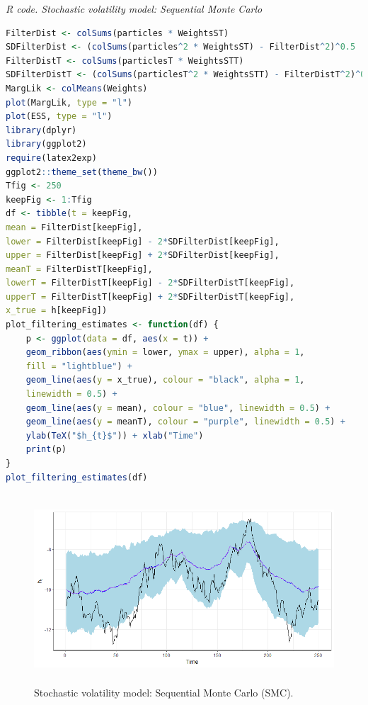 \begin{enumerate}[leftmargin=*]
\begin{tcolorbox}[enhanced,width=4.67in,center upper,
	fontupper=\large\bfseries,drop shadow southwest,sharp corners]
	\textit{R code. Stochastic volatility model: Sequential Monte Carlo}
	\begin{VF}
		\begin{lstlisting}[language=R]
FilterDist <- colSums(particles * WeightsST)
SDFilterDist <- (colSums(particles^2 * WeightsST) - FilterDist^2)^0.5
FilterDistT <- colSums(particlesT * WeightsSTT)
SDFilterDistT <- (colSums(particlesT^2 * WeightsSTT) - FilterDistT^2)^0.5
MargLik <- colMeans(Weights)
plot(MargLik, type = "l")
plot(ESS, type = "l")
library(dplyr)
library(ggplot2)
require(latex2exp)
ggplot2::theme_set(theme_bw())
Tfig <- 250
keepFig <- 1:Tfig
df <- tibble(t = keepFig,
mean = FilterDist[keepFig],
lower = FilterDist[keepFig] - 2*SDFilterDist[keepFig],
upper = FilterDist[keepFig] + 2*SDFilterDist[keepFig],
meanT = FilterDistT[keepFig],
lowerT = FilterDistT[keepFig] - 2*SDFilterDistT[keepFig],
upperT = FilterDistT[keepFig] + 2*SDFilterDistT[keepFig],
x_true = h[keepFig])
plot_filtering_estimates <- function(df) {
	p <- ggplot(data = df, aes(x = t)) +
	geom_ribbon(aes(ymin = lower, ymax = upper), alpha = 1,
	fill = "lightblue") +
	geom_line(aes(y = x_true), colour = "black", alpha = 1,
	linewidth = 0.5) +
	geom_line(aes(y = mean), colour = "blue", linewidth = 0.5) +
	geom_line(aes(y = meanT), colour = "purple", linewidth = 0.5) +
	ylab(TeX("$h_{t}$")) + xlab("Time")
	print(p)
}
plot_filtering_estimates(df)
\end{lstlisting}
	\end{VF}
\end{tcolorbox} 

\begin{figure}[!h]
	\includegraphics[width=340pt, height=200pt]{Chapters/chapter8/figures/SMCsv_resam}
	\caption[List of figure caption goes here]{Stochastic volatility model: Sequential Monte Carlo (SMC).}\label{fig5}
\end{figure} 



\end{enumerate}